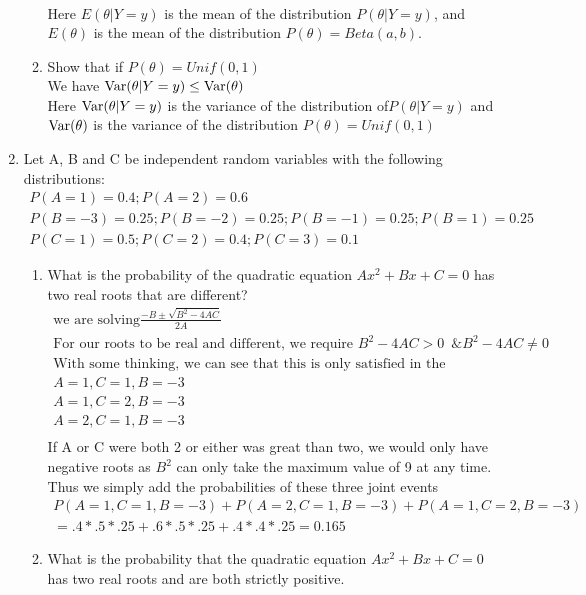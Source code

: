 \documentclass[11pt]{article}
\newcommand{\Var}{\mathop{\rm Var}}
\begin{document}
\begin{enumerate}
\begin{enumerate}
\begin{gather}
	\end{gather}
	Here $E(\theta| Y = y)$ is the mean of the distribution $P(\theta | Y = y)$, and $E(\theta)$ is the mean of the distribution
		$P(\theta) = Beta(a, b)$.
	\item Show that if $P(\theta) = Unif(0,1)$\\
	We have $\Var(\theta|Y=y)\le \Var(\theta)$\\
	Here $\Var(\theta|Y=y)$ is the variance of the distribution of$ P(\theta |Y=y)$ and $\Var(\theta)$ is the variance of the distribution $P(\theta) = Unif(0,1)$
\end{enumerate}
\item
Let A, B and C be independent random variables with the following distributions:
\begin{gather}
	P(A = 1) = 0.4; P(A = 2) = 0.6\\
	P(B = -3) = 0.25; P(B = -2) = 0.25; P(B = -1) = 0.25; P(B = 1) = 0.25\\
	P(C = 1) = 0.5; P(C = 2) = 0.4; P(C = 3) = 0.1
\end{gather}
\begin{enumerate}
	\item What is the probability of the quadratic equation $Ax^2+Bx+C=0$ has two real roots that are different?
	\begin{gather}
		\text{we are solving} \frac{-B \pm \sqrt{B^2-4AC}}{2A}\\
		\text{For our roots to be real and different, we require } B^2-4AC > 0 \, \, \, \& B^2-4AC \ne 0\\
		\text{With some thinking, we can see that this is only satisfied in the following cases}\\
		A=1,C=1,B=-3\\
		A=1,C=2,B=-3\\
		A=2,C=1,B=-3\\
	\end{gather}
	If A or C were both 2 or either was great than two, we would only have negative roots as $B^2$ can only take the maximum value of 9 at any time.\\
	Thus we simply add the probabilities of these three joint events
	\begin{gather}
		P(A=1,C=1,B=-3)+P(A=2,C=1,B=-3)+P(A=1,C=2,B=-3)\\
		 = .4*.5*.25+.6*.5*.25+.4*.4*.25 = 0.165
	\end{gather}
	\item What is the probability that the quadratic equation  $Ax^2+Bx+C=0$
	has two real roots and are both strictly positive.

\end{enumerate}
\end{enumerate}
\end{document}
